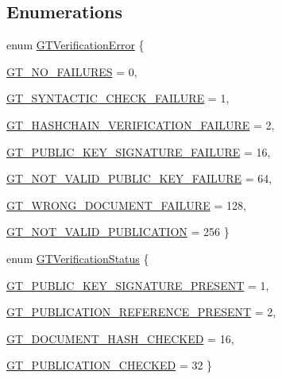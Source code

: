 \subsection*{Enumerations}
\begin{DoxyCompactItemize}
\item 
enum \hyperlink{group__verification_ga00f17574800248075712b4aa9a3faf93}{GTVerificationError} \{ \par
\hyperlink{group__verification_gga00f17574800248075712b4aa9a3faf93ad0b3e065d9489145ca8dde0e85995a23}{GT\_\-NO\_\-FAILURES} =  0, 
\par
\hyperlink{group__verification_gga00f17574800248075712b4aa9a3faf93a06490f6af403f17ad54bd9d6dcc1d26e}{GT\_\-SYNTACTIC\_\-CHECK\_\-FAILURE} =  1, 
\par
\hyperlink{group__verification_gga00f17574800248075712b4aa9a3faf93a47ce39a1f75381a408a9b9b536f9d0d3}{GT\_\-HASHCHAIN\_\-VERIFICATION\_\-FAILURE} =  2, 
\par
\hyperlink{group__verification_gga00f17574800248075712b4aa9a3faf93a499a52b5452a02af6a91257d45edb566}{GT\_\-PUBLIC\_\-KEY\_\-SIGNATURE\_\-FAILURE} =  16, 
\par
\hyperlink{group__verification_gga00f17574800248075712b4aa9a3faf93a258b08f5119a5fbd355b338afe836af0}{GT\_\-NOT\_\-VALID\_\-PUBLIC\_\-KEY\_\-FAILURE} =  64, 
\par
\hyperlink{group__verification_gga00f17574800248075712b4aa9a3faf93aa27848e0a52ca7ec1d60192e1550fd0d}{GT\_\-WRONG\_\-DOCUMENT\_\-FAILURE} =  128, 
\par
\hyperlink{group__verification_gga00f17574800248075712b4aa9a3faf93a90d79e59ed4b4925a4fce5766b0c515c}{GT\_\-NOT\_\-VALID\_\-PUBLICATION} =  256
 \}
\item 
enum \hyperlink{group__verification_gae269a951c7facac91b31ab799f9595d0}{GTVerificationStatus} \{ \par
\hyperlink{group__verification_ggae269a951c7facac91b31ab799f9595d0a7df57423a1d5add755fdb4c284a600ef}{GT\_\-PUBLIC\_\-KEY\_\-SIGNATURE\_\-PRESENT} =  1, 
\par
\hyperlink{group__verification_ggae269a951c7facac91b31ab799f9595d0a4c3c39acf3fee3df147d6b29623a26fa}{GT\_\-PUBLICATION\_\-REFERENCE\_\-PRESENT} =  2, 
\par
\hyperlink{group__verification_ggae269a951c7facac91b31ab799f9595d0abb16c35d0476c33d6a97a820ec97ed66}{GT\_\-DOCUMENT\_\-HASH\_\-CHECKED} =  16, 
\par
\hyperlink{group__verification_ggae269a951c7facac91b31ab799f9595d0af2557d8c2b53bc56273671fa78927eac}{GT\_\-PUBLICATION\_\-CHECKED} =  32
 \}
\end{DoxyCompactItemize}
